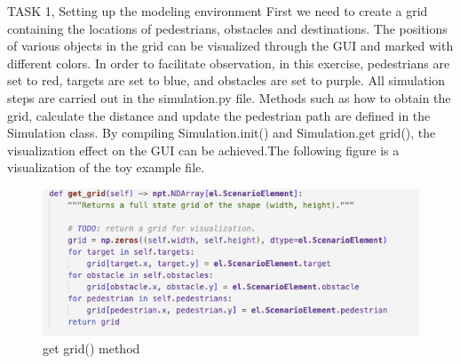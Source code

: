 \documentclass[10pt,a4paper]{article}
\begin{document}
\begin{task}{TASK 1, Setting up the modeling environment}
First we need to create a grid containing the locations of pedestrians, obstacles and destinations. The positions of various objects in the grid can be visualized through the GUI and marked with different colors. In order to facilitate observation, in this exercise, pedestrians are set to red, targets are set to blue, and obstacles are set to purple. All simulation steps are carried out in the simulation.py file. Methods such as how to obtain the grid, calculate the distance and update the pedestrian path are defined in the Simulation class. By compiling Simulation.init() and Simulation.get grid(), the visualization effect on the GUI can be achieved.The following figure is a visualization of the toy example file. 
\begin{figure}[h]
      \centering
      \includegraphics[width=0.5\linewidth]{pictures/Task1 code.png}
      \caption{get grid() method}
      \label{fig:get grid()}
  \end{figure}


\end{task}
\end{document}

